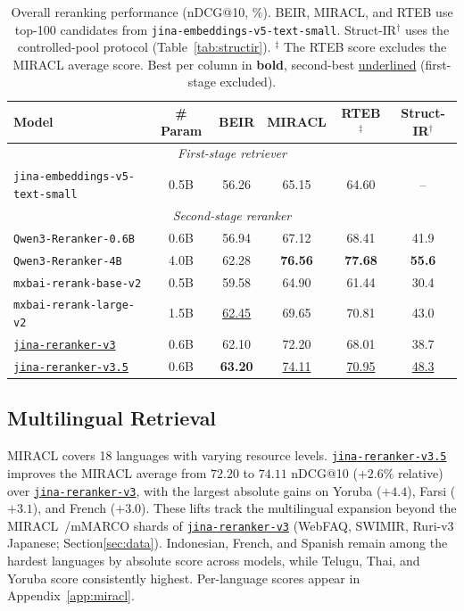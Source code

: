 \documentclass{article}
\newcommand{\jrrvthree}{\href{https://huggingface.co/jinaai/jina-reranker-v3}{\texttt{jina-reranker-v3}}}
\newcommand{\jrrvthreefive}{\href{https://huggingface.co/jinaai/jina-reranker-v3.5}{\texttt{jina-reranker-v3.5}}}
\newcommand{\qwenrerankersmall}{\texttt{Qwen3-Reranker-0.6B}}
\newcommand{\qwenrankerlarge}{\texttt{Qwen3-Reranker-4B}}
\newcommand{\jinaembedsmall}{\texttt{jina-embeddings-v5-text-small}}
\begin{document}
\begin{table}[t]
\centering
\small
\renewcommand{\arraystretch}{1.25}
\setlength{\tabcolsep}{4pt}
\begin{tabular}{@{}l c *{4}{c} @{}}
\toprule
\textbf{Model} & \textbf{\# Param} & \textbf{BEIR} & \textbf{MIRACL} & \textbf{RTEB $^\ddagger$} & \textbf{Struct-IR$^\dagger$} \\
\midrule
\multicolumn{6}{c}{\textit{First-stage retriever}} \\
\midrule
\jinaembedsmall & 0.5B & 56.26 & 65.15 & 64.60 & -- \\
\midrule
\multicolumn{6}{c}{\textit{Second-stage reranker}} \\
\midrule
\qwenrerankersmall & 0.6B & 56.94 & 67.12 & 68.41 & 41.9 \\
\qwenrankerlarge & 4.0B & 62.28 & \textbf{76.56} & \textbf{77.68} & \textbf{55.6} \\
\texttt{mxbai-rerank-base-v2} & 0.5B & 59.58 & 64.90 & 61.44 & 30.4 \\
\texttt{mxbai-rerank-large-v2} & 1.5B & \underline{62.45} & 69.65 & 70.81 & 43.0 \\
\jrrvthree & 0.6B & 62.10 & 72.20 & 68.01 & 38.7 \\
\midrule
\jrrvthreefive & 0.6B & \textbf{63.20} & \underline{74.11} & \underline{70.95} & \underline{48.3} \\
\bottomrule
\end{tabular}
\caption{Overall reranking performance (nDCG@10, \%).
BEIR, MIRACL, and RTEB use top-100 candidates from \jinaembedsmall{}.
Struct-IR$^\dagger$ uses the controlled-pool protocol (Table~\ref{tab:structir}).  $^\ddagger$ The RTEB score excludes the MIRACL average score.
Best per column in \textbf{bold}, second-best \underline{underlined} (first-stage excluded).}
\label{tab:overall}
\end{table}

\subsection{Multilingual Retrieval}
\label{sec:miracl}

MIRACL covers 18 languages with varying resource levels. \jrrvthreefive{} improves the MIRACL average from $72.20$ to $74.11$ nDCG@10 ($+2.6\%$ relative) over \jrrvthree{}, with the largest absolute gains on Yoruba ($+4.4$), Farsi ($+3.1$), and French ($+3.0$). These lifts track the multilingual expansion beyond the MIRACL~/mMARCO shards of \jrrvthree{} (WebFAQ, SWIMIR, Ruri-v3 Japanese; Section\ref{sec:data}). Indonesian, French, and Spanish remain among the hardest languages by absolute score across models, while Telugu, Thai, and Yoruba score consistently highest. Per-language scores appear in Appendix~\ref{app:miracl}.
\end{document}
